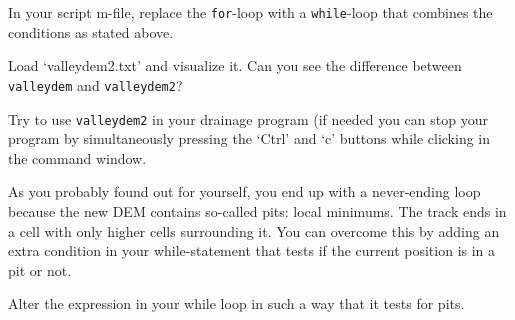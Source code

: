 \begin{action}
In your script m-file, replace the {\tt for}-loop with a {\tt while}-loop that combines the conditions as stated above.
\end{action}
\begin{action}
Load `valleydem2.txt' and visualize it. Can you see the difference between {\tt valleydem} and {\tt valleydem2}?
\end{action}
\begin{action}
Try to use {\tt valleydem2} in your drainage program (if needed you can stop your program by simultaneously pressing the `Ctrl' and `c' buttons while clicking in the \MATLAB{} command window. 
\end{action}
As you probably found out for yourself, you end up with a never-ending loop because the new DEM contains so-called pits: local minimums. The track ends in a cell with only higher cells surrounding it. You can overcome this by adding an extra condition in your while-statement that tests if the current position is in a pit or not.
\begin{action}
Alter the expression in your while loop in such a way that it tests for pits.
\end{action}
\projectfooter

\pagebreak



